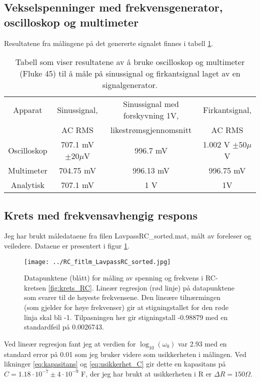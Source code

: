 \documentclass[reprint, english,notitlepage]{revtex4-1}  %
\begin{document}
\subsection{Vekselspenninger med frekvensgenerator, oscilloskop og multimeter}
Resultatene fra målingene på det genererte signalet finnes i tabell \ref{table:AC_RMS}.
\begin{table}[p]
\label{table:AC_RMS}
\caption{Tabell som viser resultatene av å bruke oscilloskop og multimeter (Fluke 45) til å måle på sinussignal og firkantsignal laget av en signalgenerator.}

\begin{adjustbox}{width=\linewidth}
\begin{tabular}{||c || c | c | c||}
\hline
Apparat     & Sinussignal, & Sinussignal med forskyvning 1V, & Firkantsignal, \\
            & AC RMS      & likestrømsgjennomsnitt          & AC RMS        \\ \hline\hline
Oscilloskop & 707.1 mV $\pm 20 \mu$V  & 996.7 mV            & 1.002 V $\pm 50 \mu$V \\ \hline
Multimeter  & 704.75 mV   & 996.13 mV                       & 996.75 mV     \\ \hline
Analytisk   & 707.1 mV    & 1 V                             & 1V            \\ \hline
\end{tabular}
\end{adjustbox}
\end{table}

\subsection{Krets med frekvensavhengig respons}
Jeg har brukt måledataene fra filen LavpassRC\_sorted.mat, målt av foreleser og veiledere. Dataene er presentert i figur \ref{fig:LavpassRC}.
\begin{figure}
  \texttt{[image: ../RC\_fitlm\_LavpassRC\_sorted.jpg]}
  \caption{Datapunktene (blått) for måling av spenning og frekvens i RC-kretsen \ref{fig:krets_RC}. Lineær regresjon (rød linje) på datapunktene som svarer til de høyeste frekvensene. Den lineære tilnærmingen (som gjelder for høye frekvenser) gir at stigningstallet for den røde linja skal bli -1. Tilpasningen her gir stigningstall -0.98879 med en standardfeil på 0.0026743.}
  \label{fig:LavpassRC}
\end{figure}
Ved lineær regresjon fant jeg at verdien for $\log_{10}(\omega_0)$ var 2.93 med en standard error på 0.01 som jeg bruker videre som usikkerheten i målingen. Ved likninger \ref{eq:kapasitans} og \ref{eq:usikkerhet_C} gir dette en kapasitans på $C = 1.18 \cdot 10^{-7} \pm 4 \cdot 10^{-9}$ F, der jeg har brukt at usikkerheten i R er $\Delta R =  150 \Omega$.
\end{document}
